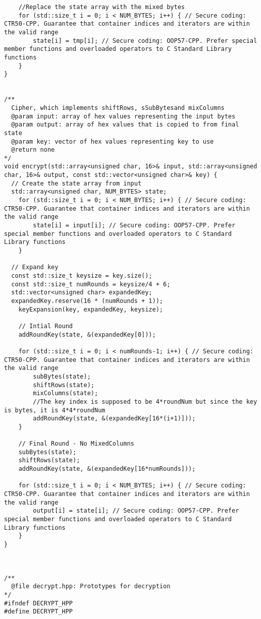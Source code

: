 \documentclass[a4paper,12pt]{article}
\begin{document}
{\begin{lstlisting}
	//Replace the state array with the mixed bytes
	for (std::size_t i = 0; i < NUM_BYTES; i++) { // Secure coding: CTR50-CPP. Guarantee that container indices and iterators are within the valid range
		state[i] = tmp[i]; // Secure coding: OOP57-CPP. Prefer special member functions and overloaded operators to C Standard Library functions
	}
}


/**
  Cipher, which implements shiftRows, sSubBytesand mixColumns
  @param input: array of hex values representing the input bytes
  @param output: array of hex values that is copied to from final state
  @param key: vector of hex values representing key to use
  @return none
*/
void encrypt(std::array<unsigned char, 16>& input, std::array<unsigned char, 16>& output, const std::vector<unsigned char>& key) {
  // Create the state array from input
  std::array<unsigned char, NUM_BYTES> state;
	for (std::size_t i = 0; i < NUM_BYTES; i++) { // Secure coding: CTR50-CPP. Guarantee that container indices and iterators are within the valid range
		state[i] = input[i]; // Secure coding: OOP57-CPP. Prefer special member functions and overloaded operators to C Standard Library functions
	}

  // Expand key
  const std::size_t keysize = key.size();
  const std::size_t numRounds = keysize/4 + 6;
  std::vector<unsigned char> expandedKey;
  expandedKey.reserve(16 * (numRounds + 1)); 
	keyExpansion(key, expandedKey, keysize);

	// Intial Round
	addRoundKey(state, &(expandedKey[0]));

	for (std::size_t i = 0; i < numRounds-1; i++) { // Secure coding: CTR50-CPP. Guarantee that container indices and iterators are within the valid range
		subBytes(state);
		shiftRows(state);
		mixColumns(state);
		//The key index is supposed to be 4*roundNum but since the key is bytes, it is 4*4*roundNum
		addRoundKey(state, &(expandedKey[16*(i+1)]));
	}

	// Final Round - No MixedColumns
	subBytes(state);
	shiftRows(state);
	addRoundKey(state, &(expandedKey[16*numRounds]));

	for (std::size_t i = 0; i < NUM_BYTES; i++) { // Secure coding: CTR50-CPP. Guarantee that container indices and iterators are within the valid range
		output[i] = state[i]; // Secure coding: OOP57-CPP. Prefer special member functions and overloaded operators to C Standard Library functions
	}
}



/**
  @file decrypt.hpp: Prototypes for decryption
*/
#ifndef DECRYPT_HPP
#define DECRYPT_HPP


\end{lstlisting}}
\end{document}
